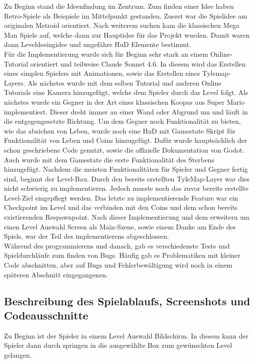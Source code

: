 \documentclass{article}
\begin{document}
Zu Beginn stand die Ideenfindung im Zentrum. Zum finden einer Idee haben Retro-Spiele als Beispiele im Mittelpunkt gestanden. Zuerst war die Spielidee am originalen Metroid orientiert. Nach weiterem suchen kam die klassischen Mega Man Spiele auf, welche dann zur Hauptidee für das Projekt wurden. Damit waren dann Leveldesingidee und ungefähre HuD Elemente bestimmt.\\
Für die Implementierung wurde sich für Beginn sehr stark an einem Online-Tutorial orientiert und teilweise Claude Sonnet 4.6. In diesem wird das Erstellen eines simplen Spielers mit Animationen, sowie das Erstellen eines Tylemap-Layers. Als nächstes wurde mit dem selben Tutorial und anderen Online Tutorials eine Kamera hinzugefügt, welche dem Spieler durch das Level folgt. Als nächstes wurde ein Gegner in der Art eines klassischen Koopas aus Super Mario implementiert. Dieser dreht immer an einer Wand oder Abgrund um und läuft in die entgegengesetzte Richtung. Um dem Gegner noch Funktionalität zu bieten, wie das abziehen von Leben, wurde noch eine HuD mit Gamestate Skript für Funktionalität von Leben und Coins hinzugefügt. Dafür wurde hauptsächlich der schon geschriebene Code genutzt, sowie die offizielle Dokumentation von Godot. Auch wurde mit dem Gamestate die erste Funktionalität des Sterbens hinzugefügt. Nachdem die meisten Funktionalitäten für Spieler und Gegner fertig sind, beginnt der Level-Bau. Durch den bereits erstellten TyleMap-Layer war dies nicht schwierig zu implementieren. Jedoch musste noch das zuvor bereits erstellte Level-Ziel eingepflegt werden. Das letzte zu implementierende Feature war ein Checkpoint im Level und das verbinden mit den Coins und dem schon bereits existierenden Respawnpoint. Nach dieser Implementierung und dem erweitern um einen Level Auswahl Screen als Main-Szene, sowie einem Danke am Ende des Spiels, war der Teil des implementierens abgeschlossen. \\
Während des programmierens und danach, gab es verschiedenste Tests und Spieldurchläufe zum finden von Bugs. Häufig gab es Problematiken mit kleiner Code abschnitten, aber auf Bugs und Fehlerbewältigung wird noch in einem späteren Abschnitt eingegangenen.\\

\subsection{Beschreibung des Spielablaufs, Screenshots und Codeausschnitte}

Zu Beginn ist der Spieler in einem Level Auswahl Bildschirm. In diesem kann der Spieler dann durch springen in die ausgewählte Box zum gewünschten Level gelangen. 
\end{document}
